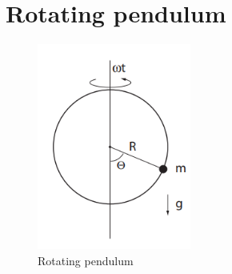 \documentclass[11pt]{amsart}
\begin{document}
\section{Rotating pendulum}

\begin{figure}
\centering
	\includegraphics[width = 0.45\textwidth]{rotating_pendulum.png}
	\caption{Rotating pendulum}
	\label{fig:rotating_pendulum}
\end{figure}
\end{document}
